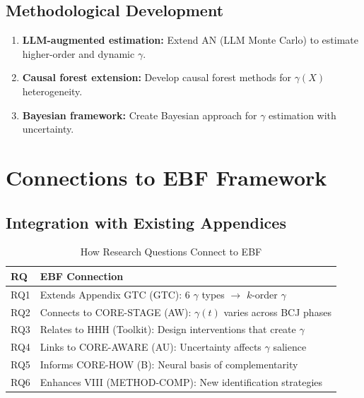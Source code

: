 \subsection{Methodological Development}

\begin{enumerate}
    \item \textbf{LLM-augmented estimation:} Extend AN (LLM Monte Carlo) to estimate higher-order and dynamic $\gamma$.

    \item \textbf{Causal forest extension:} Develop causal forest methods for $\gamma(X)$ heterogeneity.

    \item \textbf{Bayesian framework:} Create Bayesian approach for $\gamma$ estimation with uncertainty.
\end{enumerate}

\section{Connections to EBF Framework}
\label{sec:ebf-connections}

\subsection{Integration with Existing Appendices}

\begin{table}[h]
\centering
\caption{How Research Questions Connect to EBF}
\label{tab:ebf-connections}
\renewcommand{\arraystretch}{1.3}
\begin{tabular}{@{}lp{9cm}@{}}
\toprule
\textbf{RQ} & \textbf{EBF Connection} \\
\midrule
RQ1 & Extends Appendix GTC (GTC): 6 $\gamma$ types $\to$ $k$-order $\gamma$ \\
RQ2 & Connects to CORE-STAGE (AW): $\gamma(t)$ varies across BCJ phases \\
RQ3 & Relates to HHH (Toolkit): Design interventions that create $\gamma$ \\
RQ4 & Links to CORE-AWARE (AU): Uncertainty affects $\gamma$ salience \\
RQ5 & Informs CORE-HOW (B): Neural basis of complementarity \\
RQ6 & Enhances VIII (METHOD-COMP): New identification strategies \\
\bottomrule
\end{tabular}
\end{table}

